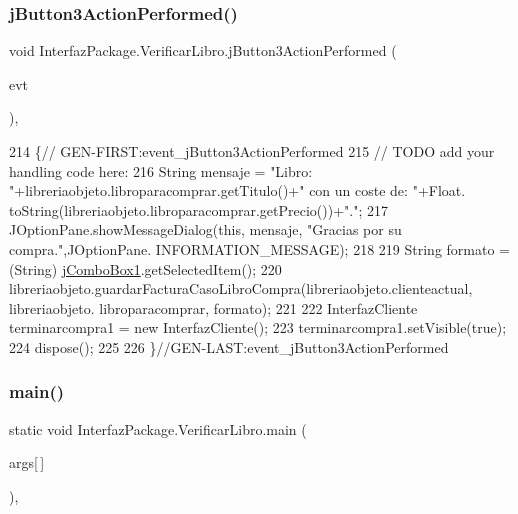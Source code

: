 \subsubsection{\texorpdfstring{j\+Button3\+Action\+Performed()}{jButton3ActionPerformed()}}
{\footnotesize\ttfamily void Interfaz\+Package.\+Verificar\+Libro.\+j\+Button3\+Action\+Performed (\begin{DoxyParamCaption}\item[{java.\+awt.\+event.\+Action\+Event}]{evt }\end{DoxyParamCaption})\hspace{0.3cm}{\ttfamily [inline]}, {\ttfamily [private]}}


\begin{DoxyCode}
214                                                                          \{\textcolor{comment}{//
      GEN-FIRST:event\_jButton3ActionPerformed}
215         \textcolor{comment}{// TODO add your handling code here:}
216         String mensaje = \textcolor{stringliteral}{"Libro: "}+libreriaobjeto.libroparacomprar.getTitulo()+\textcolor{stringliteral}{" con un coste de: "}+Float.
      toString(libreriaobjeto.libroparacomprar.getPrecio())+\textcolor{stringliteral}{"."};
217         JOptionPane.showMessageDialog(\textcolor{keyword}{this}, mensaje, \textcolor{stringliteral}{"Gracias por su compra."},JOptionPane.
      INFORMATION\_MESSAGE);
218         
219         String formato = (String) \mbox{\hyperlink{class_interfaz_package_1_1_verificar_libro_a5f8fd3453828fec1a8baafb3788ee5c6}{jComboBox1}}.getSelectedItem();
220         libreriaobjeto.guardarFacturaCasoLibroCompra(libreriaobjeto.clienteactual, libreriaobjeto.
      libroparacomprar, formato);
221         
222         InterfazCliente terminarcompra1 = \textcolor{keyword}{new} InterfazCliente();
223         terminarcompra1.setVisible(\textcolor{keyword}{true});
224         dispose();
225         
226     \}\textcolor{comment}{//GEN-LAST:event\_jButton3ActionPerformed}
\end{DoxyCode}
\mbox{\label{class_interfaz_package_1_1_verificar_libro_ab9ea8b3c763d9d3f43efefa6a3390761}} 
\subsubsection{\texorpdfstring{main()}{main()}}
{\footnotesize\ttfamily static void Interfaz\+Package.\+Verificar\+Libro.\+main (\begin{DoxyParamCaption}\item[{String}]{args\mbox{[}$\,$\mbox{]} }\end{DoxyParamCaption})\hspace{0.3cm}{\ttfamily [inline]}, {\ttfamily [static]}}


